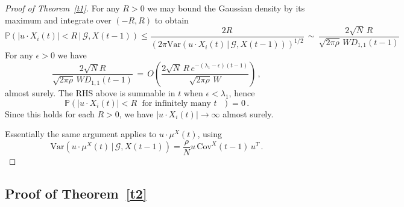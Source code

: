 \documentclass[12pt]{article}
\newcommand{\1}{\mathbf{1}}
\begin{document}
\begin{proof}[Proof of Theorem~\ref{t1}]
For any $R> 0$ we may bound the Gaussian density by its maximum and integrate over $(-R,R)$ to obtain
$$\mathbb{P}(|u \cdot X_i(t)| < R \,|\, \mathcal{G}, X(t-1)) \le \frac{ 2 R}{\left(2\pi \mathrm{Var}(u \cdot X_i(t) \,|\, \mathcal{G}, X(t-1))\right)^{1/2}}\, \sim\, \frac{2 \sqrt{N}\, R }{\sqrt{2\pi\rho} \,W D_{1,1}(t-1)}$$ For any $\epsilon > 0$ we have
$$\frac{2\sqrt{N} R }{\sqrt{2\pi\rho} \,W D_{1,1}(t-1)}\,=\, O\left(\frac{2\sqrt{N}\, R\, e^{-(\lambda_1-\epsilon) (t-1)}}{\sqrt{2\pi\rho}\,W }\right)\,, $$
almost surely.  The RHS above is summable in $t$ when $\epsilon < \lambda_1$, hence 
$$\mathbb{P}( | u \cdot X_i(t) | < R\; \text{ for infinitely many $t$ }) = 0\,. $$
Since this holds for each $R>0$, we have $|u \cdot X_i(t)| \to \infty$ almost surely.

Essentially the same argument applies to $u\cdot \mu^X(t)$, using 
$$\mathrm{Var}(u \cdot \mu^X(t) \,|\, \mathcal{G}, X(t-1)) = \frac{\rho}{N} u\, \mathrm{Cov}^X\!(t-1)\, u^T\,. $$
\end{proof}

 







\subsection{Proof of Theorem~\ref{t2}}
\end{document}
